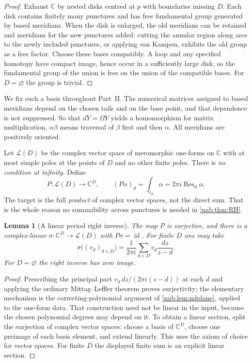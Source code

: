 \documentclass[11pt,letterpaper]{article}
\newtheorem{lemma}[lemma]{Lemma}
\theoremstyle{definition}
\theoremstyle{remark}
\newcommand{\C}{\mathbb C}
\newcommand{\LL}{\mathcal L}
\newcommand{\Res}{\operatorname{Res}}
\newcommand{\id}{\operatorname{id}}
\numberwithin{equation}{section}
\begin{document}
\begin{proof}
Exhaust $\C$ by nested disks centred at $p$ with boundaries missing $D$. Each
disk contains finitely many punctures and has free fundamental group generated
by based meridians. When the disk is enlarged, the old meridians can be
retained and meridians for the new punctures added: cutting the annular region
along arcs to the newly included punctures, or applying van Kampen, exhibits
the old group as a free factor. Choose these bases compatibly. A loop and any
specified homotopy have compact image, hence occur in a sufficiently large
disk, so the fundamental group of the union is free on the union of the
compatible bases. For $D=\varnothing$ the group is trivial.
\end{proof}

We fix such a basis throughout Part~II. The numerical matrices assigned to
based meridians depend on the chosen tails and on the base point, and that
dependence is not suppressed. So that $dY=\Omega Y$ yields a homomorphism for
matrix multiplication, $\alpha\beta$ means traversal of $\beta$ first and then
$\alpha$. All meridians are positively oriented.

Let $\LL(D)$ be the complex vector space of meromorphic one-forms on $\C$ with
at most simple poles at the points of $D$ and no other finite poles. There is
\emph{no condition at infinity}. Define
\begin{equation}\label{nab:eq:periodmap}
 P:\LL(D)\longrightarrow\C^D,
 \qquad (P\alpha)_d=\int_{\ell_d}\alpha=2\pi i\Res_d\alpha.
\end{equation}
The target is the full \emph{product} of complex vector spaces, not the direct
sum. That is the whole reason no summability across punctures is needed in
\cref{nab:thm:RH}.

\begin{lemma}[A linear period right inverse]\label{nab:lem:period}
The map $P$ is surjective, and there is a complex-linear
$\sigma:\C^D\to\LL(D)$ with $P\sigma=\id$. For finite $D$ one may take
\begin{equation}\label{nab:eq:finitesection}
 \sigma\bigl((v_d)_{d\in D}\bigr)
 =\frac1{2\pi i}\sum_{d\in D}v_d\frac{dz}{z-d}.
\end{equation}
For $D=\varnothing$ the right inverse has zero image.
\end{lemma}

\begin{proof}
Prescribing the principal part $v_d\,dz/(2\pi i(z-d))$ at each $d$ and
applying the ordinary Mittag--Leffler theorem proves surjectivity; the
elementary mechanism is the correcting-polynomial argument of
\cref{nab:lem:mlplane}, applied to the one-form data. That construction need
not be linear in the input, because the chosen polynomial degrees may depend
on it. To obtain a linear section, split the surjection of complex vector
spaces: choose a basis of $\C^D$, choose one preimage of each basis element,
and extend linearly. This uses the axiom of choice for vector spaces. For
finite $D$ the displayed finite sum is an explicit linear section.
\end{proof}
\end{document}
